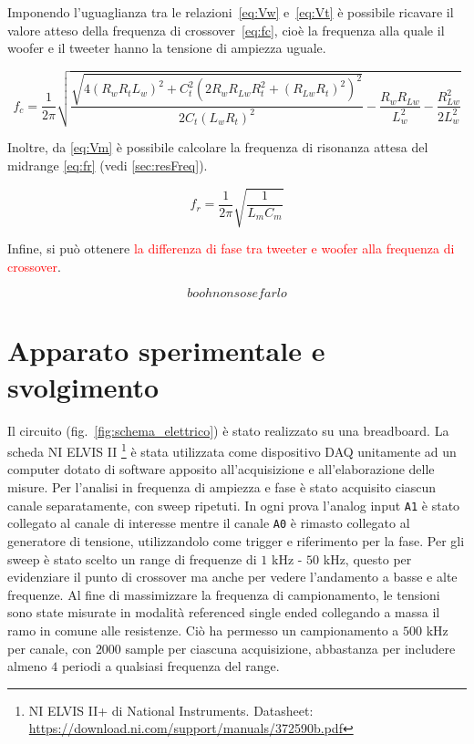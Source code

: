 \documentclass[12pt,italian]{article}
\newcommand{\err}[1]{\textcolor{red}{#1}}
\begin{document}
Imponendo l'uguaglianza tra le relazioni~\eqref{eq:Vw} e~\eqref{eq:Vt} è
possibile ricavare il valore atteso della frequenza di crossover~\eqref{eq:fc},
cioè la frequenza alla quale il woofer e il tweeter hanno la tensione di
ampiezza uguale.

\begin{equation}
	f_{c} = \frac{1}{2\pi}\sqrt{\frac{\sqrt{4 (R_{w} R_{t} L_{w})^2 + C_{t}^2(2
				R_{w} R_{Lw} R_{t}^2 + (R_{Lw} R_{t})^2)^2}}{2 C _{t} (L_{w} R_{t})^2 } -
		\frac{R_{w} R_{Lw}}{L_{w}^2} - \frac{R_{Lw}^2}{2 L_{w}^2}}
	\label{eq:fc}
\end{equation}

Inoltre, da \eqref{eq:Vm} è possibile calcolare la frequenza di risonanza attesa del midrange \eqref{eq:fr} (vedi \cref{sec:resFreq}).

\begin{equation}
	f_{r} = \frac{1}{2\pi}\sqrt{\frac{1}{L_{m} C_{m}}}  %
	\label{eq:fr}
\end{equation}

Infine, si può ottenere \err{la differenza di fase tra tweeter e woofer alla frequenza di crossover}.

\begin{equation}
	booh non so se farlo
\end{equation}

\section*{Apparato sperimentale e svolgimento}

Il circuito (fig.~\ref{fig:schema_elettrico}) è stato realizzato su una
breadboard. La scheda NI ELVIS II \footnote{NI ELVIS II+ di National
	Instruments. Datasheet:
	\url{https://download.ni.com/support/manuals/372590b.pdf}} è stata utilizzata
come dispositivo DAQ unitamente ad un computer dotato di software apposito
all'acquisizione e all'elaborazione delle misure. Per l'analisi in frequenza di
ampiezza e fase è stato acquisito ciascun canale separatamente, con sweep
ripetuti. In ogni prova l'analog input \texttt{A1} è stato collegato al canale
di interesse mentre il canale \texttt{A0} è rimasto collegato al generatore di
tensione, utilizzandolo come trigger e riferimento per la fase. Per gli sweep è
stato scelto un range di frequenze di $1$ kHz - $50$ kHz, questo per
evidenziare il punto di crossover ma anche per vedere l'andamento a basse e
alte frequenze. Al fine di massimizzare la frequenza di campionamento, le
tensioni sono state misurate in modalità referenced single ended collegando a
massa il ramo in comune alle resistenze. Ciò ha permesso un campionamento a
$500$ kHz per canale, con $2000$ sample per ciascuna acquisizione, abbastanza
per includere almeno $4$ periodi a qualsiasi frequenza del range.
\end{document}
